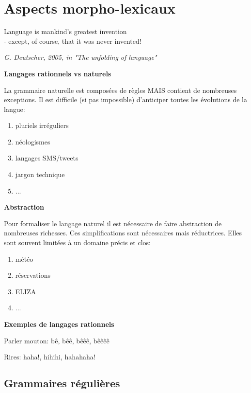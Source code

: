 \vspace{-1.2cm}

\section{Aspects morpho-lexicaux}

\epigraph{Language is mankind's greatest invention \\- except, of course, that it was never invented!}{\textit{G. Deutscher, 2005, in "The unfolding of language"}}

\textbf{Langages rationnels vs naturels}

La grammaire naturelle est composées de règles MAIS contient de nombreuses exceptions. Il est difficile (si pas impossible) d'anticiper toutes les évolutions de la langue:

\begin{enumerate}
    \item pluriels irréguliers
    \item néologismes
    \item langages SMS/tweets
    \item jargon technique
    \item ...\\
\end{enumerate}

\textbf{Abstraction}

Pour formaliser le langage naturel il est nécessaire de faire abstraction de nombreuses richesses. Ces simplifications sont nécessaires mais réductrices. Elles sont souvent limitées à un domaine précis et clos:

\begin{enumerate}
    \item météo
    \item réservations
    \item ELIZA
    \item ...\\
\end{enumerate}

\textbf{Exemples de langages rationnels}

Parler mouton: bê, bêê, bêêê, bêêêê

Rires: haha!, hihihi, hahahaha!

\subsection{Grammaires régulières}

